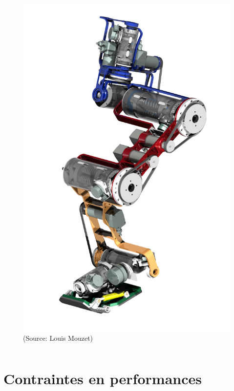 \documentclass[10pt]{beamer}
\begin{document}
\begin{frame}[allowframebreaks]
\begin{figure}[H]
\begin{columns}[T]
\begin{column}{.3\textwidth}
      \includegraphics[width=\textwidth]{figs/jambeFlexibleRaideurVariable}\\
      \footnotesize{(Source: Louis Mouzet)}
		\end{column}
	\end{columns}
	\end{figure}
	\framebreak
	
\end{frame}



\section{Contraintes en performances}
\end{document}
